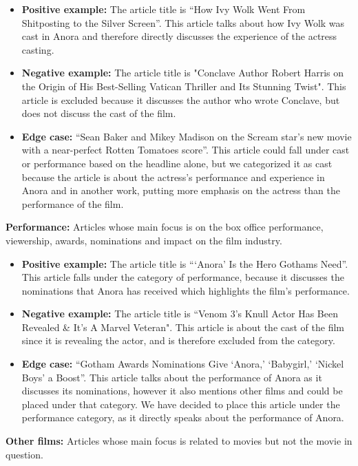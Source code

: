 \documentclass[letterpaper]{article} %
\begin{document}
\begin{itemize}
\item\textbf{Positive example:} The article title is “How Ivy Wolk Went From Shitposting to the Silver Screen”. This article talks about how Ivy Wolk was cast in Anora and therefore directly discusses the experience of the actress casting. 
\item\textbf{Negative example:} The article title is "Conclave Author Robert Harris on the Origin of His Best-Selling Vatican Thriller and Its Stunning Twist". This article is excluded because it discusses the author who wrote Conclave, but does not discuss the cast of the film. 
\item\textbf{Edge case:} “Sean Baker and Mikey Madison on the Scream star's new movie with a near-perfect Rotten Tomatoes score”. This article could fall under cast or performance based on the headline alone, but we categorized it as cast because the article is about the actress’s performance and experience in Anora and in another work, putting more emphasis on the actress than the performance of the film. 
\end{itemize}
\textbf{Performance:} Articles whose main focus is on the box office performance, viewership, awards, nominations and impact on the film industry.
\begin{itemize}
\item\textbf{Positive example:} The article title is “‘Anora’ Is the Hero Gothams Need”. This article falls under the category of performance, because it discusses the nominations that Anora has received which highlights the film’s performance.
\item\textbf{Negative example:} The article title is “Venom 3's Knull Actor Has Been Revealed \& It's A Marvel Veteran". This article is about the cast of the film since it is revealing the actor, and is therefore excluded from the category.
\item\textbf{Edge case:} “Gotham Awards Nominations Give ‘Anora,’ ‘Babygirl,’ ‘Nickel Boys’ a Boost”. This article talks about the performance of Anora as it discusses its nominations, however it also mentions other films and could be placed under that category. We have decided to place this article under the performance category, as it directly speaks about the performance of Anora. 
\end{itemize}
\textbf{Other films:} Articles whose main focus is related to movies but not the movie in question. 
\end{document}
